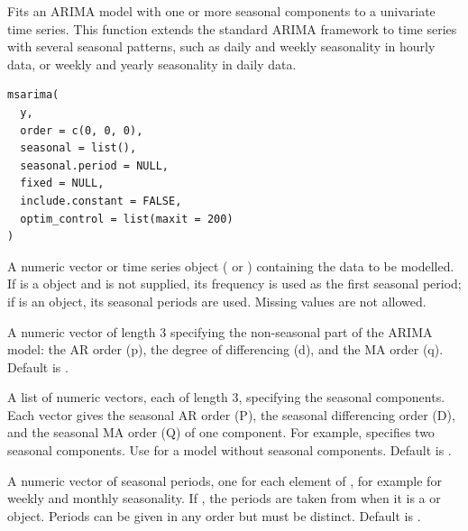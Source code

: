 \documentclass[a4paper]{book}
\begin{document}
%
\begin{Description}
Fits an ARIMA model with one or more seasonal components to a univariate time series.
This function extends the standard ARIMA framework to time series with several
seasonal patterns, such as daily and weekly seasonality in hourly data, or weekly
and yearly seasonality in daily data.
\end{Description}
%
\begin{Usage}
\begin{verbatim}
msarima(
  y,
  order = c(0, 0, 0),
  seasonal = list(),
  seasonal.period = NULL,
  fixed = NULL,
  include.constant = FALSE,
  optim_control = list(maxit = 200)
)
\end{verbatim}
\end{Usage}
%
\begin{Arguments}
\begin{ldescription}
\item[\code{y}] A numeric vector or time series object ( or ) containing
the data to be modelled. If  is a  object and 
is not supplied, its frequency is used as the first seasonal period; if  is
an  object, its seasonal periods are used. Missing values are not
allowed.

\item[\code{order}] A numeric vector of length 3 specifying the non-seasonal part of the
ARIMA model: the AR order (p), the degree of differencing (d), and the MA order (q).
Default is .

\item[\code{seasonal}] A list of numeric vectors, each of length 3, specifying the seasonal
components. Each vector gives the seasonal AR order (P), the seasonal differencing
order (D), and the seasonal MA order (Q) of one component. For example,
 specifies two seasonal components. Use
 for a model without seasonal components. Default is .

\item[\code{seasonal.period}] A numeric vector of seasonal periods, one for each element of
, for example  for weekly and monthly seasonality.
If , the periods are taken from  when it is a  or
 object. Periods can be given in any order but must be distinct.
Default is .


\end{ldescription}
\end{Arguments}
\end{document}
